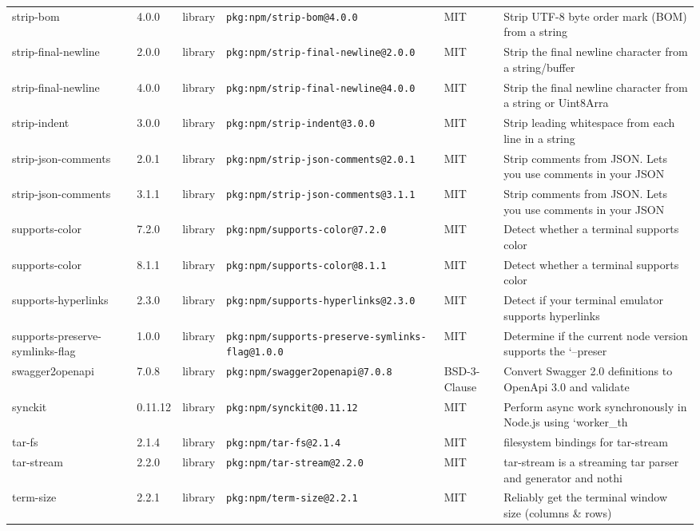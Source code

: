 \documentclass[11pt]{article}
\begin{document}
\begin{longtable}{|l|l|l|p{2.2cm}|l|p{4cm}|}
strip-bom & 4.0.0 & library & \texttt{pkg:npm/strip-bom@4.0.0} & MIT & Strip UTF-8 byte order mark (BOM) from a string \\
strip-final-newline & 2.0.0 & library & \texttt{pkg:npm/strip-final-newline@2.0.0} & MIT & Strip the final newline character from a string/buffer \\
strip-final-newline & 4.0.0 & library & \texttt{pkg:npm/strip-final-newline@4.0.0} & MIT & Strip the final newline character from a string or Uint8Arra \\
strip-indent & 3.0.0 & library & \texttt{pkg:npm/strip-indent@3.0.0} & MIT & Strip leading whitespace from each line in a string \\
strip-json-comments & 2.0.1 & library & \texttt{pkg:npm/strip-json-comments@2.0.1} & MIT & Strip comments from JSON. Lets you use comments in your JSON \\
strip-json-comments & 3.1.1 & library & \texttt{pkg:npm/strip-json-comments@3.1.1} & MIT & Strip comments from JSON. Lets you use comments in your JSON \\
supports-color & 7.2.0 & library & \texttt{pkg:npm/supports-color@7.2.0} & MIT & Detect whether a terminal supports color \\
supports-color & 8.1.1 & library & \texttt{pkg:npm/supports-color@8.1.1} & MIT & Detect whether a terminal supports color \\
supports-hyperlinks & 2.3.0 & library & \texttt{pkg:npm/supports-hyperlinks@2.3.0} & MIT & Detect if your terminal emulator supports hyperlinks \\
supports-preserve-symlinks-flag & 1.0.0 & library & \texttt{pkg:npm/supports-preserve-symlinks-flag@1.0.0} & MIT & Determine if the current node version supports the `--preser \\
swagger2openapi & 7.0.8 & library & \texttt{pkg:npm/swagger2openapi@7.0.8} & BSD-3-Clause & Convert Swagger 2.0 definitions to OpenApi 3.0 and validate \\
synckit & 0.11.12 & library & \texttt{pkg:npm/synckit@0.11.12} & MIT & Perform async work synchronously in Node.js using `worker\_th \\
tar-fs & 2.1.4 & library & \texttt{pkg:npm/tar-fs@2.1.4} & MIT & filesystem bindings for tar-stream \\
tar-stream & 2.2.0 & library & \texttt{pkg:npm/tar-stream@2.2.0} & MIT & tar-stream is a streaming tar parser and generator and nothi \\
term-size & 2.2.1 & library & \texttt{pkg:npm/term-size@2.2.1} & MIT & Reliably get the terminal window size (columns \& rows) \\

\end{longtable}
\end{document}
